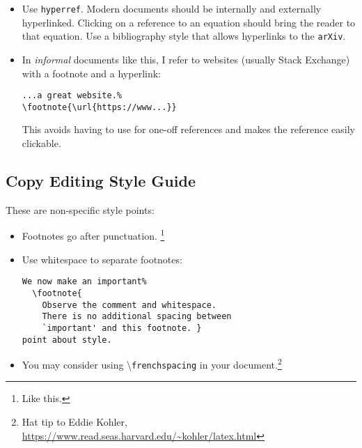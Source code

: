 \begin{itemize}
	\item Use \texttt{hyperref}. Modern documents should be internally and externally hyperlinked. Clicking on a reference to an equation should bring the reader to that equation. Use a bibliography style that allows hyperlinks to the \texttt{arXiv}.
	\item In \emph{informal} documents like this, I refer to websites (usually Stack Exchange) with a footnote and a hyperlink:
\begin{lstlisting}[style=latexstyle]
...a great website.%
\footnote{\url{https://www...}}
\end{lstlisting}
	This avoids having to use \BibTeX for one-off references and makes the reference easily clickable. 
\end{itemize}


\subsection{Copy Editing Style Guide}

These are non-specific style points:

\begin{itemize}
	\item Footnotes go after punctuation.%
			\footnote{Like this.}
	\item Use whitespace to separate footnotes:
\begin{lstlisting}[style=latexstyle]
We now make an important%
  \footnote{
	Observe the comment and whitespace.
	There is no additional spacing between
	`important' and this footnote. }
point about style.
\end{lstlisting}
	\item You may consider using \textbackslash\texttt{frenchspacing} in your document.\footnote{Hat tip to Eddie Kohler, \url{https://www.read.seas.harvard.edu/~kohler/latex.html}}
\end{itemize}